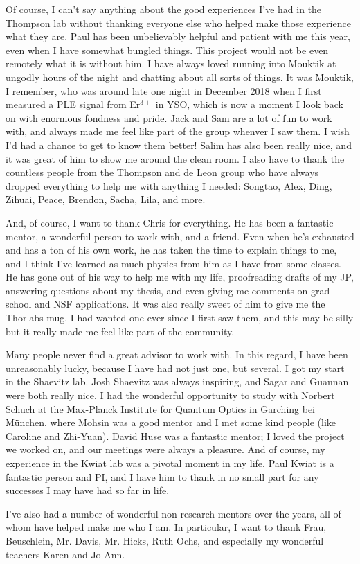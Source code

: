 \documentclass[12pt]{report}
\newcommand{\erbium}[1][ ]{Er$^{3+}$#1}
\begin{document}
Of course, I can't say anything about the good experiences I've had in the Thompson lab without thanking everyone else who helped make those experience what they are. Paul has been unbelievably helpful and patient with me this year, even when I have somewhat bungled things. This project would not be even remotely what it is without him. I have always loved running into Mouktik at ungodly hours of the night and chatting about all sorts of things. It was Mouktik, I remember, who was around late one night in December 2018 when I first measured a PLE signal from \erbium in YSO, which is now a moment I look back on with enormous fondness and pride. Jack and Sam are a lot of fun to work with, and always made me feel like part of the group whenver I saw them. I wish I'd had a chance to get to know them better! Salim has also been really nice, and it was great of him to show me around the clean room. I also have to thank the countless people from the Thompson and de Leon group who have always dropped everything to help me with anything I needed: Songtao, Alex, Ding, Zihuai, Peace, Brendon, Sacha, Lila, and more.

And, of course, I want to thank Chris for everything. He has been a fantastic mentor, a wonderful person to work with, and a friend. Even when he's exhausted and has a ton of his own work, he has taken the time to explain things to me, and I think I've learned as much physics from him as I have from some classes. He has gone out of his way to help me with my life, proofreading drafts of my JP, answering questions about my thesis, and even giving me comments on grad school and NSF applications. It was also really sweet of him to give me the Thorlabs mug. I had wanted one ever since I first saw them, and this may be silly but it really made me feel like part of the community.

Many people never find a great advisor to work with. In this regard, I have been unreasonably lucky, because I have had not just one, but several. I got my start in the Shaevitz lab. Josh Shaevitz was always inspiring, and Sagar and Guannan were both really nice. I had the wonderful opportunity to study with Norbert Schuch at the Max-Planck Institute for Quantum Optics in Garching bei M\"unchen, where Mohsin was a good mentor and I met some kind people (like Caroline and Zhi-Yuan). David Huse was a fantastic mentor; I loved the project we worked on, and our meetings were always a pleasure. And of course, my experience in the Kwiat lab was a pivotal moment in my life. Paul Kwiat is a fantastic person and PI, and I have him to thank in no small part for any successes I may have had so far in life.

I've also had a number of wonderful non-research mentors over the years, all of whom have helped make me who I am. In particular, I want to thank Frau, Beuschlein, Mr. Davis, Mr. Hicks, Ruth Ochs, and especially my wonderful teachers Karen and Jo-Ann.
\end{document}
